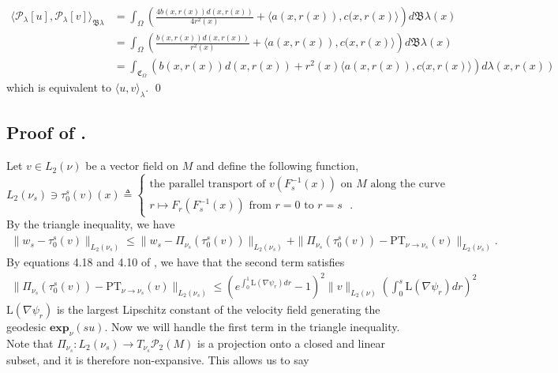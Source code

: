 \documentclass[11pt]{article}
\newcommand{\man}{M}
\begin{document}
\begin{align*}
    \langle \mathcal{P}_{\lambda}[u], \mathcal{P}_{\lambda}[v]\rangle_{\mathfrak{B}\lambda} &= \int_{\Omega} \left(\frac{4b(x, r(x))d(x, r(x))}{4r^2(x)} +  \langle a(x, r(x)), c(x,r(x)\rangle\right)d\mathfrak{B\lambda}(x) \\
    &= \int_{\Omega}\left(\frac{b(x, r(x))d(x, r(x))}{r^2(x)} +  \langle a(x, r(x)), c(x,r(x)\rangle\right)d\mathfrak{B\lambda}(x) \\
    &= \int_{\mathfrak{C}_\Omega}\left(b(x, r(x))d(x, r(x)) +  r^2(x)\langle a(x, r(x)), c(x,r(x)\rangle\right)d\lambda(x, r(x))
\end{align*}
which is equivalent to $\langle u, v \rangle_\lambda$. \qed{}

\subsection{Proof of .} \label{sec: proof of one step parallel transport approx}
Let $v \in L_2(\nu)$ be a vector field on $M$ and define the following function, 
\begin{equation*}
    L_2(\nu_s) \ni \tau_0^s(v)(x) \triangleq \begin{cases}
        \text{the parallel transport of $v(F_s^{-1}(x))$ on $\man$ along the curve} \\
        r \mapsto F_r(F_s^{-1}(x)) \text{ from $r = 0$ to $r = s$ }.
    \end{cases}
\end{equation*}
By the triangle inequality, we have
\begin{align*}
    \|w_s - \tau_0^s(v)\|_{L_2(\nu_s)} \leq \|w_s - \Pi_{\nu_s}(\tau_0^s(v))\|_{L_2(\nu_s)} + \|\Pi_{\nu_s}(\tau_0^s(v)) - \text{PT}_{\nu \rightarrow \nu_s}(v)\|_{L_2(\nu_s)}.
\end{align*}
By equations 4.18 and 4.10 of \citet{gigli2012second}, we have that the second term satisfies
\begin{align*}
    \|\Pi_{\nu_s}(\tau_0^s(v)) - \text{PT}_{\nu \rightarrow \nu_s}(v)\|_{L_2(\nu_s)} \leq \left(e^{\int_0^1\text{L}(\nabla \psi_r)dr} - 1\right)^2\|v\|_{L_2(\nu)}\left(\int_0^s\text{L}(\nabla\psi_r)dr\right)^2
\end{align*}
$\text{L}(\nabla\psi_r)$ is the largest Lipschitz constant of the velocity field generating the geodesic $\mathbf{exp}_{\nu}(su).$ Now we will handle the first term in the triangle inequality. Note that $\Pi_{\nu_s}: L_2(\nu_s) \rightarrow T_{\nu_s}\mathcal{P}_{2}(\man)$ is a projection onto a closed and linear subset, and it is therefore non-expansive. This allows us to say
\end{document}
